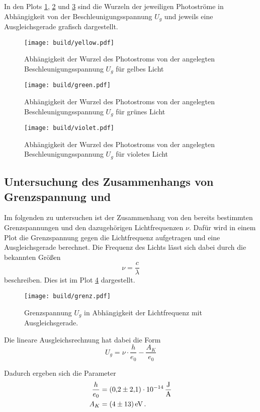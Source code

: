 In den Plots \ref{fig:gelb}, \ref{fig:gruen} und \ref{fig:violet} sind die Wurzeln der jeweiligen Photoströme in Abhängigkeit von der 
Beschleunigungsspannung $U_g$ und jeweils eine Ausgleichsgerade grafisch dargestellt.

\begin{figure}
  \centering
  \texttt{[image: build/yellow.pdf]}
  \caption{Abhängigkeit der Wurzel des Photostroms von der angelegten Beschleunigungsspannung $U_g$ für gelbes Licht}
  \label{fig:gelb}
\end{figure}
\begin{figure}
  \centering
  \texttt{[image: build/green.pdf]}
  \caption{Abhängigkeit der Wurzel des Photostroms von der angelegten Beschleunigungsspannung $U_g$ für grünes Licht}
  \label{fig:gruen}
\end{figure}
\begin{figure}
  \centering
  \texttt{[image: build/violet.pdf]}
  \caption{Abhängigkeit der Wurzel des Photostroms von der angelegten Beschleunigungsspannung $U_g$ für violetes Licht}
  \label{fig:violet}
\end{figure}
\FloatBarrier

\subsection{Untersuchung des Zusammenhangs von Grenzspannung und }

Im folgenden zu untersuchen ist der Zusammenhang von den bereits bestimmten Grenzspannungen und den dazugehörigen Lichtfrequenzen $\nu$.
Dafür wird in einem Plot die Grenzspannung gegen die Lichtfrequenz aufgetragen und eine Ausgleichsgerade berechnet. Die Frequenz des Lichts
lässt sich dabei durch die bekannten Größen
\begin{equation}
    \nu = \frac{c}{\lambda}
\end{equation}
beschreiben.
Dies ist im Plot \ref{fig:rip} dargestellt.
\begin{figure}
    \centering
    \texttt{[image: build/grenz.pdf]}
    \caption{Grenzspannung $U_g$ in Abhängigkeit der Lichtfrequenz mit Ausgleichsgerade.}
    \label{fig:rip}
\end{figure}
\FloatBarrier

Die lineare Ausgleichsrechnung hat dabei die Form 
\begin{equation}
    U_g = \nu\cdot \frac{h}{e_0} - \frac{A_K}{e_0}
\end{equation}

Dadurch ergeben sich die Parameter 
\begin{align*}
    \frac{h}{e_0} &= \SI{0.2(21)e-14}{\frac{\joule}{\ampere}} \\
    A_K           &= \SI{04(13)}{\electronvolt}\,.
\end{align*}
